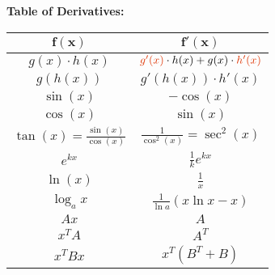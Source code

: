 \begin{tcolorbox}[colback=blue!5!white,colframe=blue!75!black,title=\textbf{Introduction}]
\textbf{Table of Derivatives:}
\begin{center}
\begin{tabular}{|c|c|}
	\hline 
	\textbf{$\mathbf{f(x)}$} & \textbf{$\mathbf{f'(x)}$} \\ 
	\hline 
	$ g(x) \cdot h(x)$& ${\color{red}g'(x)} \cdot h(x) + g(x) \cdot {\color{red}h'(x)}$ \\ 
	\hline 
	$ g(h(x))$ & $g'(h(x)) \cdot h'(x)$ \\ 
	\hline 
	$\sin(x)$ & $-\cos(x)$ \\ 
	\hline 
	$\cos(x)$ & $\sin(x)$ \\ 
	\hline 
	$\tan(x) = \frac{\sin(x)}{\cos(x)}$& $ \frac{1}{\cos^2(x)} = \sec^2(x)$ \\ 
	\hline 
	$e^{kx}$& $\frac{1}{k}e^{kx} $\\ 
	\hline 
	$\ln(x)$& $\frac{1}{x}$ \\ 
	\hline 
	$\log_ax$& $\frac{1}{\ln a}(x\ln x -x)$ \\ 
	\hline 
	$Ax$ & $A$ \\
	\hline
	$x^T A$ & $A^T$ \\
	\hline
	$x^T B x $ & $x^T(B^T + B)$\\
	\hline
	\end{tabular} 
\end{center}
\end{tcolorbox}